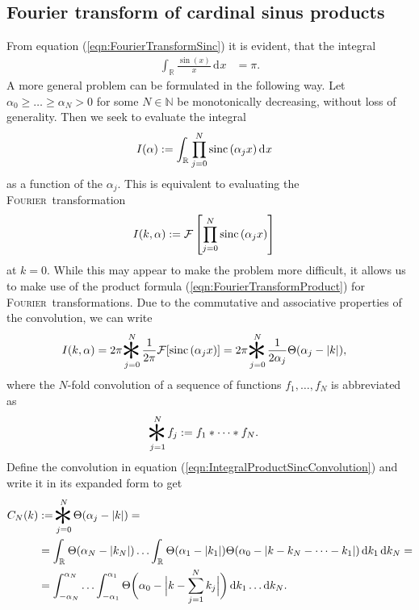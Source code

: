 \documentclass[german, parskip=full]{scrartcl}
\newcommand{\intx}{}
\newcommand{\intr}{}
\newcommand{\kla}{}
\newcommand{\klam}{}
\newcommand*{\Fourier}{\textsc{Fourier}\ }
\newcommand*{\F}{\mathcal{F}}
\newcommand*{\sinc}{\text{sinc\,}}
\newcommand{\conv}{\mathop{\scalebox{3.5}{\raisebox{-0.38ex}{\makebox[0.5\width][c]{$\ast$}}}}\limits}
\begin{document}
\subsection{Fourier transform of cardinal sinus products}
From equation (\ref{eqn:FourierTransformSinc}) it is evident, that the integral
\begin{align}
\intr\int_{\mathbb{R}^{ }}{\frac{\sin (x)}{x}}\,\mathrm{d}^{ }x&=\pi. \label{eqn:IntegralSinc}
\end{align}
A more general problem can be formulated in the following way.
Let $\alpha_0\ge\dots\ge\alpha_N > 0$ for some $N\in\mathbb{N}$ be monotonically decreasing, without loss of generality.
Then we seek to evaluate the integral
\begin{align}
I(\alpha)&:=\intr\int_{\mathbb{R}^{ }}{\prod_{j=0}^N\sinc(\alpha_jx)}\,\mathrm{d}^{ }x \label{eqn:IntegralProductSinc}
\end{align}
as a function of the $\alpha_j$.
This is equivalent to evaluating the \Fourier transformation 
\begin{align}
I(k,\alpha)&:=\F\klam\left[ {\prod_{j=0}^N\sinc(\alpha_jx)} \right] \label{eqn:IntegralProductSincFT}
\end{align}
at $k=0$.
While this may appear to make the problem more difficult, it allows us to make use of the product formula (\ref{eqn:FourierTransformProduct}) for \Fourier transformations.
Due to the commutative and associative properties of the convolution, we can write
\begin{align}
I(k,\alpha)&=2\pi\conv_{j=0}^{N}\frac{1}{2\pi}\F[\sinc (\alpha_jx)]=2\pi\conv_{j=0}^N\frac{1}{2\alpha_j}\Theta(\alpha_j-|k|), \label{eqn:IntegralProductSincConvolution} 
\end{align}
where the $N$-fold convolution of a sequence of functions $f_1,\dots,f_N$ is abbreviated as
\begin{align}
\conv_{j=1}^N f_j&:=f_1\ast\dots\ast f_N. \label{eqn:ConvolutionNfold}
\end{align}
Define the convolution in equation (\ref{eqn:IntegralProductSincConvolution}) and write it in its expanded form to get
\begin{align*}
C_N(k)&:=\conv_{j=0}^N\Theta (\alpha_j-|k|)=\\
&=\int_{\mathbb{R}^{ }}\Theta(\alpha_N-|k_N|)\dots\int_{\mathbb{R}^{ }}\Theta(\alpha_1-|k_1|)\Theta(\alpha_0-|k-k_N-\dots-k_1|)\,\mathrm{d}k_1\,\mathrm{d}k_N=\\
&=\intx\int_{-\alpha_N}^{\alpha_N}\dots\intx\int_{-\alpha_1}^{\alpha_1}\Theta\kla\bigg( {\alpha_0-\Big\vert k - \sum_{j=1}^Nk_j\Big\vert} \bigg)\,\mathrm{d}k_1\dots\mathrm{d}k_N.
\end{align*}
\end{document}
